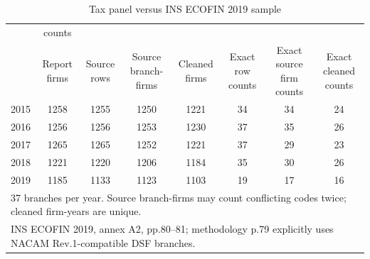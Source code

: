\begin{table}[htbp]\centering
\caption{Tax panel versus INS ECOFIN 2019 sample}
\begin{tabular}{l*{7}{c}}
\toprule
            &      counts&            &            &            &            &            &            \\
            &Report firms& Source rows&Source branch-firms&Cleaned firms&Exact row counts&Exact source firm counts&Exact cleaned counts\\
\midrule
2015        &        1258&        1255&        1250&        1221&          34&          34&          24\\
2016        &        1256&        1256&        1253&        1230&          37&          35&          26\\
2017        &        1265&        1265&        1252&        1221&          37&          29&          23\\
2018        &        1221&        1220&        1206&        1184&          35&          30&          26\\
2019        &        1185&        1133&        1123&        1103&          19&          17&          16\\
\bottomrule
\multicolumn{8}{l}{\footnotesize 37 branches per year. Source branch-firms may count conflicting codes twice; cleaned firm-years are unique.}\\
\multicolumn{8}{l}{\footnotesize INS ECOFIN 2019, annex A2, pp.80--81; methodology p.79 explicitly uses NACAM Rev.1-compatible DSF branches.}\\
\end{tabular}
\end{table}
